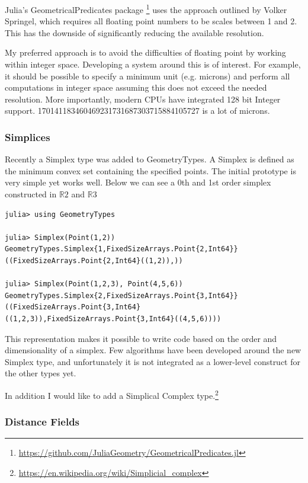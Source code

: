 \documentclass[a4paper]{article}
\begin{document}
Julia's GeometricalPredicates package \footnote{\url{https://github.com/JuliaGeometry/GeometricalPredicates.jl}}
uses the approach outlined by Volker Springel, which requires all floating point
numbers to be scales between 1 and 2.\cite{Springel_2010} This has the downside
of significantly reducing the available resolution. 

My preferred approach is to avoid the difficulties of floating point by working
within integer space. Developing a system around this is of interest. For
example, it should be possible to specify a minimum unit (e.g. microns)
and perform all computations in integer space assuming this does not exceed
the needed resolution. More importantly, modern CPUs have integrated 128 bit
Integer support. 170141183460469231731687303715884105727 is a lot of microns.

\subsubsection{Simplices}

Recently a Simplex type was added to GeometryTypes. A Simplex is defined
as the minimum convex set containing the specified points. The initial
prototype is very simple yet works well. Below we can see a 0th and 1st order
simplex constructed in $\mathbb{R}2$ and $\mathbb{R}3$
\begin{lstlisting}
julia> using GeometryTypes

julia> Simplex(Point(1,2))
GeometryTypes.Simplex{1,FixedSizeArrays.Point{2,Int64}}((FixedSizeArrays.Point{2,Int64}((1,2)),))

julia> Simplex(Point(1,2,3), Point(4,5,6))
GeometryTypes.Simplex{2,FixedSizeArrays.Point{3,Int64}}((FixedSizeArrays.Point{3,Int64}((1,2,3)),FixedSizeArrays.Point{3,Int64}((4,5,6))))
\end{lstlisting}

This representation makes it possible to write code based on the order and
dimensionality of a simplex. Few algorithms have been developed around the
new Simplex type, and unfortunately it is not integrated as a lower-level
construct for the other types yet.

In addition I would like to add a Simplical Complex type.\footnote{\url{https://en.wikipedia.org/wiki/Simplicial_complex}}

\subsubsection{Distance Fields}
\end{document}
